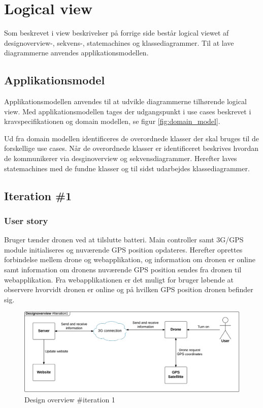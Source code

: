 \section{Logical view}

Som beskrevet i view beskrivelser på forrige side består logical viewet af designoverview-, sekvens-, statemachines og klassediagrammer. Til at lave diagrammerne anvendes applikationsmodellen.

\subsection{Applikationsmodel}
Applikationsmodellen anvendes til at udvikle diagrammerne tilhørende logical view. Med applikationsmodellen tages der udgangspunkt i use cases beskrevet i kravspecifikationen og domain modellen, se figur \ref{fig:domain_model}.
  
Ud fra domain modellen identificeres de overordnede klasser der skal bruges til de forskellige use cases. Når de overordnede klasser er identificeret beskrives hvordan de kommunikerer via desginoverview og sekvensdiagrammer. Herefter laves statemachines med de fundne klasser og til sidst udarbejdes klassediagrammer.


\subsection{Iteration \#1}

\subsubsection*{User story}

Bruger tænder dronen ved at tilslutte batteri. Main controller samt 3G/GPS module initialiseres og nuværende GPS position opdateres. Herefter oprettes forbindelse mellem drone og webapplikation, og information om dronen er online samt information om dronens nuværende GPS position sendes fra dronen til webapplikation. Fra webapplikationen er det muligt for bruger løbende at observere hvorvidt dronen er online og på hvilken GPS position dronen befinder sig.

\begin{figure}[H]
	\centering
	\includegraphics[width=1\textwidth]{Billeder/design_overview/design_overview_iteration1.png}
	\vspace{-.5cm}
	\caption{Design overview \#iteration 1}
	\label{fig:design_overview_UC1}
\end{figure}


